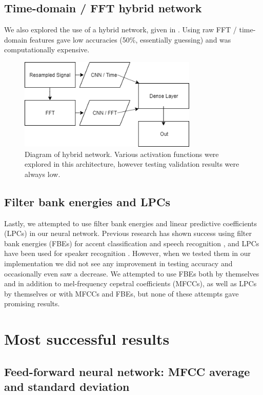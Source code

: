 \documentclass{article}
\begin{document}
\subsection{Time-domain / FFT hybrid network}
\label{subsec:fft}

We also explored the use of a hybrid network, given in .
Using raw FFT / time-domain features gave low accuracies (50\%, essentially guessing) and was computationally expensive.

\begin{figure}[htb]
	\centering
	\includegraphics[width = 8.5cm]{figs/hybrid_network}
	\caption{Diagram of hybrid network.
	Various activation functions were explored in this architecture, however testing validation results were always low.}
	\label{fig:hybrid}
\end{figure}

\subsection{Filter bank energies and LPCs}
\label{subsec:fbe}

Lastly, we attempted to use filter bank energies and linear predictive coefficients (LPCs) in our neural network.
Previous research has shown success using filter bank energies (FBEs) for accent classification and speech recognition \cite{Paliwal, chuaccent}, and LPCs have been used for speaker recognition \cite{lpc}.
However, when we tested them in our implementation we did not see any improvement in testing accuracy and occasionally even saw a decrease.
We attempted to use FBEs both by themselves and in addition to mel-frequency cepstral coefficients (MFCCs), as well as LPCs by themselves or with MFCCs and FBEs, but none of these attempts gave promising results.

\section{Most successful results}
\label{sec:success}

\subsection{Feed-forward neural network: MFCC average and standard deviation}
\label{subsec:feedforward}
\end{document}
